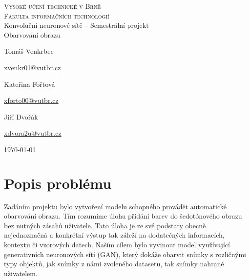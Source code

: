 \documentclass[12pt, a4paper]{article}
\begin{document}
    \begin{titlepage}
        \begin{center}
            {\Huge
            \textsc{Vysoké učení technické v Brně}}\\
            {\huge \textsc{Fakulta informačních technologií}\\
            }
            {\LARGE
            Konvoluční neuronové sítě -- Semestrální projekt}\\
            {\Huge Obarvování obrazu\\
            \vspace{250pt}}

            {\Large
            \begin{center}
                \begin{minipage}[b]{0.33333\textwidth}
                    \raggedright
                    Tomáš Venkrbec \par
                    \href{mailto:xvenkr01@vutbr.cz}{xvenkr01@vutbr.cz} 
                \end{minipage}%
                \begin{minipage}[b]{0.33333\textwidth}
                    \centering
                    Kateřina Fořtová \par
                    \href{mailto:xforto00@vutbr.cz}{xforto00@vutbr.cz}
                \end{minipage}%
                \begin{minipage}[b]{0.33333\textwidth}
                    \raggedleft
                    Jiří Dvořák \par
                    \href{mailto:xdvora2u@vutbr.cz}{xdvora2u@vutbr.cz}
                \end{minipage}
            \end{center}}

            \vspace{30pt}
            {\Large \today}
        \end{center}
    \end{titlepage}
    
    \section{Popis problému}
    Zadáním projektu bylo vytvoření modelu schopného provádět automatické obarvování obrazu. Tím rozumíme úlohu přidání barev do šedotónového obrazu bez nutných zásahů uživatele. Tato úloha je ze své podstaty obecně nejednoznačná a konkrétní výstup tak záleží na dodatečných informacích, kontextu či vzorových datech. Naším cílem bylo vyvinout model využívající generativních neuronových sítí (GAN), který dokáže obarvit snímky s rozličnými typy objektů, jak snímky z námi zvoleného datasetu, tak snímky nahrané uživatelem. 
    
\end{document}
